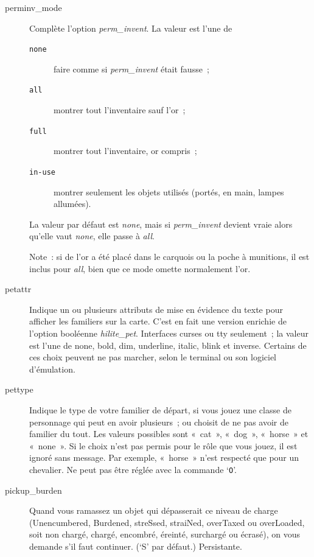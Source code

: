 \documentclass[titlepage]{article}
\begin{document}
\begin{description}
\item[{perminv\_mode}]
Complète l'option
\textit{perm\_invent}.
La valeur est l'une de
\begin{description}
\item[{\texttt{none}}]
faire comme si \textit{perm\_invent} était fausse~;
\item[{\texttt{all}}]
montrer tout l'inventaire sauf l'or~;
\item[{\texttt{full}}]
montrer tout l'inventaire, or compris~;
\item[{\texttt{in-use}}]
montrer seulement les objets utilisés (portés, en main, lampes
allumées).
\end{description}
La valeur par défaut est \textit{none}, mais si \textit{perm\_invent} devient vraie
alors qu'elle vaut \textit{none}, elle passe à \textit{all}.


Note~: si de l'or a été placé dans le carquois ou la poche à munitions, il
est inclus pour \textit{all}, bien que ce mode omette normalement l'or.

\item[{petattr}]
Indique un ou plusieurs attributs de mise en évidence du texte pour
afficher les familiers sur la carte.
C'est en fait une version enrichie de l'option booléenne
\textit{hilite\_pet}.
Interfaces curses ou tty seulement~; la valeur est l'une de none, bold,
dim, underline, italic, blink et inverse.
Certains de ces choix peuvent ne pas marcher, selon le terminal ou son
logiciel d'émulation.

\item[{pettype}]
Indique le type de votre familier de départ, si vous jouez une classe de
personnage qui peut en avoir plusieurs~; ou choisit de ne pas avoir de
familier du tout.
Les valeurs possibles sont «~cat~», «~dog~», «~horse~»
et «~none~».
Si le choix n'est pas permis pour le rôle que vous jouez, il est ignoré
sans message.
Par exemple, «~horse~» n'est respecté que pour un chevalier.
Ne peut pas être réglée avec la commande `\texttt{O}'.

\item[{pickup\_burden}]
Quand vous ramassez un objet qui dépasserait ce niveau de charge
(Unencumbered, Burdened, streSsed, straiNed, overTaxed ou overLoaded, soit
non chargé, chargé, encombré, éreinté, surchargé ou écrasé), on vous
demande s'il faut continuer.
(`S' par défaut.)
Persistante.


\end{description}
\end{document}
